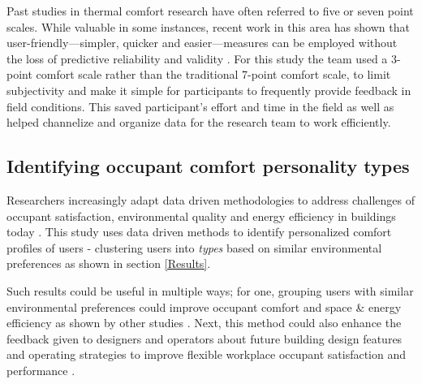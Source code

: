 \documentclass[]{interact}
\theoremstyle{plain}%
\theoremstyle{definition}
\theoremstyle{remark}
\begin{document}
Past studies in thermal comfort research have often referred to five or seven point scales. While valuable in some instances, recent work in this area has shown that user-friendly---simpler, quicker and easier---measures can be employed without the loss of predictive reliability and validity \cite{dolnicar2007user, krosnick2018questionnaire, dolnicar2011three}. For this study the team used a 3-point comfort scale rather than the traditional 7-point comfort scale, to limit subjectivity and make it simple for participants to frequently provide feedback in field conditions. This saved participant's effort and time in the field as well as helped channelize and organize data for the research team to work efficiently. 



\subsection{Identifying occupant comfort personality types}
Researchers increasingly adapt data driven methodologies to address challenges of occupant satisfaction, environmental quality and energy efficiency in buildings today \cite{Textmining, occupantcomplaints, IEQandsatisfaction}. This study uses data driven methods to identify personalized comfort profiles of users - clustering users into \emph{types} based on similar environmental preferences as shown in section \ref{Results}. 

Such results could be useful in multiple ways; for one, grouping users with similar environmental preferences could improve occupant comfort and space \& energy efficiency as shown by other studies \cite{KAMARULZAMAN2011262}. Next, this method could also enhance the feedback given to designers and operators about future building design features and operating strategies to improve flexible workplace occupant satisfaction and performance \cite{KWON2019356}.
\end{document}
